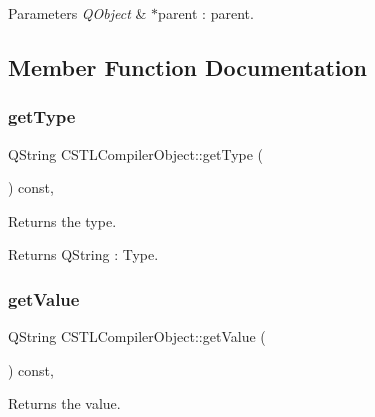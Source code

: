 \begin{DoxyParams}{Parameters}
{\em Q\+Object} & $\ast$parent \+: parent. \\
\hline
\end{DoxyParams}


\subsection{Member Function Documentation}
\mbox{\label{class_c_s_t_l_compiler_object_a3e853137310474444650ad78e307b9a8}} 
\subsubsection{\texorpdfstring{get\+Type}{getType}}
{\footnotesize\ttfamily Q\+String C\+S\+T\+L\+Compiler\+Object\+::get\+Type (\begin{DoxyParamCaption}{ }\end{DoxyParamCaption}) const\hspace{0.3cm}{\ttfamily [inline]}, {\ttfamily [slot]}}



Returns the type. 

\begin{DoxyReturn}{Returns}
Q\+String \+: Type. 
\end{DoxyReturn}
\mbox{\label{class_c_s_t_l_compiler_object_a3ee0eea5271717302cd4cb34720b656e}} 
\subsubsection{\texorpdfstring{get\+Value}{getValue}}
{\footnotesize\ttfamily Q\+String C\+S\+T\+L\+Compiler\+Object\+::get\+Value (\begin{DoxyParamCaption}{ }\end{DoxyParamCaption}) const\hspace{0.3cm}{\ttfamily [inline]}, {\ttfamily [slot]}}



Returns the value. 

